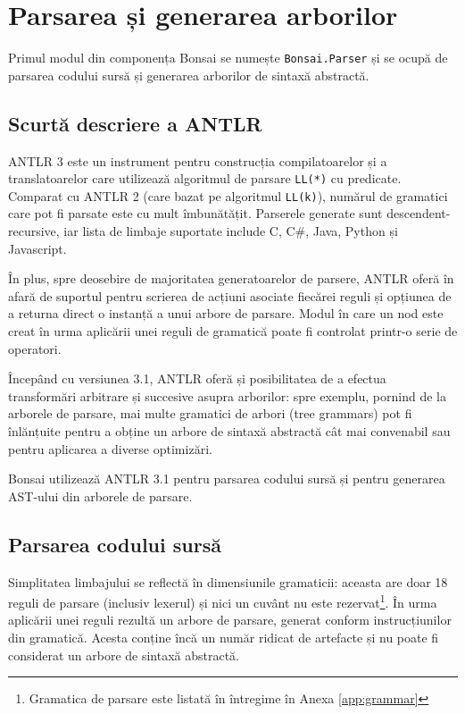 \documentclass[12pt,a4paper]{memoir}
\renewcommand{\c}{\texttt}
\begin{document}
\chapter{Parsarea și generarea arborilor}

Primul modul din componența Bonsai se numește \c{Bonsai.Parser} și se ocupă de parsarea codului sursă și generarea arborilor de sintaxă abstractă.

\section{Scurtă descriere a ANTLR}

ANTLR 3\cite{antlr} este un instrument pentru construcția compilatoarelor și a translatoarelor care utilizează algoritmul de parsare \c{LL(*)} cu predicate\cite{definitive_antlr_reference}. Comparat cu ANTLR 2 (care bazat pe algoritmul \c{LL(k)}), numărul de gramatici care pot fi parsate este cu mult îmbunătățit. Parserele generate sunt descendent-recursive, iar lista de limbaje suportate\cite{antlr_targets} include C, C\#, Java, Python și Javascript. 

În plus, spre deosebire de majoritatea generatoarelor de parsere, ANTLR oferă în afară de suportul pentru scrierea de acțiuni asociate fiecărei reguli și opțiunea de a returna direct o instanță a unui arbore de parsare. Modul în care un nod este creat în urma aplicării unei reguli de gramatică poate fi controlat printr-o serie de operatori\cite[cap. 7]{definitive_antlr_reference}.

Începând cu versiunea 3.1, ANTLR oferă și posibilitatea de a efectua transformări arbitrare și succesive asupra arborilor: spre exemplu, pornind de la arborele de parsare, mai multe gramatici de arbori (tree grammars) pot fi înlănțuite pentru a obține un arbore de sintaxă abstractă cât mai convenabil sau pentru aplicarea a diverse optimizări\cite{antlr_tree_grammars}\cite[cap. 8]{definitive_antlr_reference}.

Bonsai utilizează ANTLR 3.1 pentru parsarea codului sursă și pentru generarea AST-ului din arborele de parsare.

\section{Parsarea codului sursă}

Simplitatea limbajului se reflectă în dimensiunile gramaticii: aceasta are doar 18 reguli de parsare (inclusiv lexerul) și nici un cuvânt nu este rezervat\footnote{Gramatica de parsare este listată în întregime în Anexa \ref{app:grammar}}. În urma aplicării unei reguli rezultă un arbore de parsare, generat conform instrucțiunilor din gramatică. Acesta conține încă un număr ridicat de artefacte și nu poate fi considerat un arbore de sintaxă abstractă.
\end{document}
